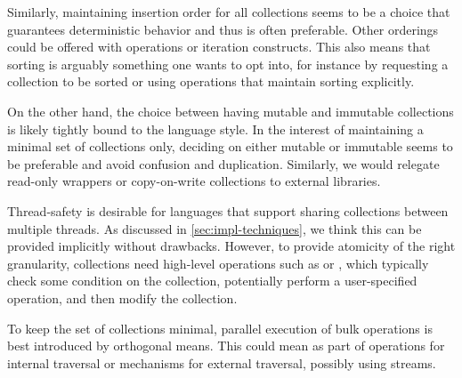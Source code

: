 \documentclass[sigconf, 10pt]{acmart}
\begin{document}
\label{sec:insertion-ordering-choice}
Similarly, maintaining insertion order for all collections seems to be a choice
that guarantees deterministic behavior and thus is often preferable.
Other orderings could be offered with operations or iteration constructs.
This also means that sorting is arguably something one wants to opt into,
for instance by requesting a collection to be sorted or using operations that
maintain sorting explicitly.

On the other hand, the choice between having mutable and immutable collections is likely tightly
bound to the language style.
In the interest of maintaining a minimal set of collections only,
deciding on either mutable or immutable seems to be preferable and avoid confusion and duplication.
Similarly, we would relegate read-only wrappers or copy-on-write collections
to external libraries.

\label{sec:design-thread-safety}
Thread-safety is desirable for languages
that support sharing collections between multiple threads.
As discussed in \cref{sec:impl-techniques},
we think this can be provided implicitly without drawbacks.
However, to provide atomicity of the right granularity,
collections need high-level operations
such as  or ,
which typically check some condition on the collection,
potentially perform a user-specified operation, and then modify the collection.


To keep the set of collections minimal,
parallel execution of bulk operations is
best introduced by orthogonal means.
This could mean as part of operations for internal traversal
or mechanisms for external traversal, possibly using streams.
\end{document}
